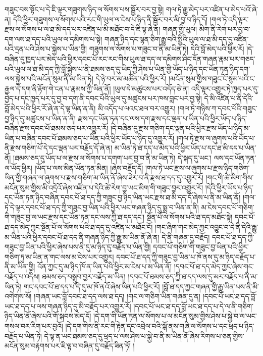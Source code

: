 གཟུང་བས་སྟོང་པ་དེ་ཇི་ལྟར་གཟུགས་ཉིད་ལ་སོགས་པས་སྦྱོར་བར་བྱ་སྟེ། གལ་ཏེ་རྒྱུ་མེད་པར་འཛིན་པ་མེད་པའོ་ཞེ་ན། དེའི་ཕྱིར་གཟུགས་ལ་སོགས་པའི་རང་གི་ཡུལ་ལ་ངེས་པ་ཉིད་ནི་སྦྱོར་བར་མི་བྱ་བ་ཉིད་དོ། །གལ་ཏེ་འདི་ལྟར་རྫས་ལ་སོགས་པ་ལ་ཐ་མི་དད་པར་འཛིན་པ་མི་མཐོང་བ་དེ་ཇི་ལྟ་ཞེ་ན། གཞན་གྱི་ཡུལ། མིག་ནི་རེག་པར་བྱ་བ་དག་ལས་ཐ་དད་པའི་ཡུལ་ལ་དམིགས་པ་སྟེ། གཞན་ཉིད་དང་ལྷན་ཅིག་རྒྱུ་བའི་སྤྱིའི་ཡུལ་ལ་ཐ་མི་དད་དུ་འཛིན་པའི་དྲན་པའི་ཤེས་པ་སྐྱེས་པ་ཡིན་གྱི། གཟུགས་ལ་སོགས་པ་གཟུང་བ་ནི་མ་ཡིན་ཏེ། དེའི་བློ་མེད་པའི་ཕྱིར་རོ། །དེ་བཞིན་དུ་ཁྱད་པར་མེད་པའི་ཕྱིར་དབང་པོ་རང་རང་གིས་ཡུལ་ཐ་དད་ལ་དམིགས་ཤིང་དོན་གཞན་རྣམ་པར་གཅད་པའི་ཡུལ་ལ་ཐ་མི་དད་ཀྱི་བློ་སྐྱེས་པ་ནི་ཐམས་ཅད་དུ་ཡིད་ཀྱི་ཤེས་པ་ཡིན་གྱི་ཡོད་པ་ཉིད་དང་ཡོན་ཏན་ཉིད་དག་ལས་སྐྱེས་པའི་མངོན་སུམ་ནི་མ་ཡིན་ཏེ། དེ་ཉེ་བར་མ་མཚོན་པའི་ཕྱིར་རོ། །མངོན་སུམ་གྱིས་གཟུང་ངོ་སྙམ་པའི་ང་རྒྱལ་དེ་དག་ནི་རྟོག་གེ་ངན་པ་རྣམས་ཀྱི་ཡིན་ནོ། །ཡུལ་དེ་མཚུངས་པར་འདོད་ཅེ་ན། འདི་ལྟར་འགྱུར་ཏེ་ཁྱད་པར་དུ་བྱེད་པ་དང་ཁྱད་པར་དུ་བྱ་བ་དག་ནི་དབང་པོའི་ཡུལ་དུ་མཚུངས་པར་ཁས་བླང་པར་བྱ་སྟེ། དེ་མི་འཛིན་པ་ནི་དེའི་བློ་མེད་པའི་ཕྱིར་རོ་ཞེ་ན་དེ་ལྟ་ཡིན་ན་ནི། མི་འདོད་པ་ལའང་ཐལ་བར་འགྱུར། །གལ་ཏེ་གཉིས་ཀ་དབང་པོའི་གཟུང་བྱ་ཉིད་དུ་མཚུངས་པ་ཡིན་ན་ནི། རྫས་དང་ཡོན་ཏན་དང་ལས་དག་རྫས་དང་ལྡན་པ་ཡིན་པའི་ཕྱིར་ཡོད་པ་ཉིད་བཞིན་རྫས་དབང་པོ་ཐམས་ཅད་པར་འགྱུར་རོ། །དེ་བཞིན་དུ་རྫས་གཅིག་དང་ལྡན་པའི་ཕྱིར་རྫས་ཡོད་པ་ཉིད་མ་ཡིན་པ་བཞིན་དབང་པོ་ཐམས་ཅད་པ་ཡིན་པའི་ཕྱིར་ཡོད་པ་ཉིད་དུ་འགྱུར་རོ། །གལ་ཏེ་རྫས་ལ་ཞུགས་པའི་ཡོད་པ་ནི་རྫས་གཅིག་པོ་དེ་དང་ལྡན་པར་བརྗོད་དོ་ཞེ་ན། མ་ཡིན་ཏེ་ཐ་དད་པ་མེད་པའི་ཕྱིར་ཡོད་པ་དང་ཐ་མི་དད་པ་ཡིན་ནོ། །ཐམས་ཅད་དུ་ཡོད་པ་ལ་རྫས་ལ་སོགས་པ་དགག་པར་བྱ་བ་ནི་མ་ཡིན་ཏེ། དེ་སྐད་དུ་ཡང་། ལས་དང་ཡོན་ཏན་ལ་ཡོད་ཕྱིར། །ཡོད་པ་ལས་མིན་ཡོན་ཏན་མིན། །ཞེས་བརྗོད་དོ། །གལ་ཏེ་ཡང་རྫས་ལ་ཞུགས་པ་རྫས་ཉིད་གཅིག་ཡིན་གྱི་གཞན་ལ་ཞུགས་པ་རྫས་གཅིག་མ་ཡིན་ནོ་ཞེས་ཟེར་བ་ནི་རྫས་ཐ་དད་དུ་འགྱུར་རོ། །གང་གི་ཚེ་མིག་གིས་མངོན་སུམ་གྱིས་མི་འདྲེའོ་ཞེས་འཛིན་པ་དེའི་ཚེ་རེག་བྱ་ཡང་མིག་གི་གཟུང་བྱར་འགྱུར་རོ། །དེའི་ཕྱིར་ཡོད་པ་ཉིད་དང་ཡོན་ཏན་ཉིད་བཞིན་དབང་པོ་ཐ་དད་ཀྱི་གཟུང་བྱ་ཉིད་ཡིན་ཡང་རྫས་ཐ་མི་དད་དོ་ཞེས་པ་ནི་མ་ཡིན་ནོ། །གལ་ཏེ་དེ་ལྟར་དབང་པོ་ཐ་དད་ཀྱི་གཟུང་བྱ་ཡིན་པའི་ཕྱིར་ཡང་གཞན་ཉིད་དུ་སྨྲ་བ་ཡིན་ན་ནི། མ་ངེས་དབང་པོ་གཅིག་གི་གཟུང་བྱ་ལ་ཡང་རྫས་དང་ཡོན་ཏན་དང་ལས་ཀྱི་ཐ་དད་དང་། སྔོན་པོ་ལ་སོགས་པའི་ཐ་དད་མཐོང་སྟེ། དབང་པོ་ཐ་དད་མེད་ཀྱང་སྔོན་པོ་ལ་སོགས་པའི་ཐ་དད་དུ་འཛིན་པ་མཐོང་ངོ། །གང་ཞིག་གང་མེད་ཀྱང་འབྱུང་བ་དེ་ནི་དེའི་རྒྱུ་མ་ཡིན་པའི་ཕྱིར་དབང་པོ་ཐ་དད་ནི་གཞན་ཉིད་ཀྱི་རྒྱུ་མ་ཡིན་ནོ་ཞེ་ན། དེ་ནི་གཞན་དུ་བརྗོད། དབང་པོ་ཐ་དད་ཀྱི་གཟུང་བྱ་ཡིན་པའི་ཕྱིར་ཞེས་པས་ནི་དུ་མ་ཉིད་དུ་བརྗོད་པ་ཡིན་གྱི། དབང་པོ་གཅིག་གི་གཟུང་བྱ་ཡིན་པའི་ཕྱིར་གཅིག་ཏུ་མ་ཡིན་ན་གང་ལས་མ་ངེས་པར་འགྱུར། དབང་པོ་ཐ་དད་ཀྱི་གཟུང་བྱ་ཡིན་པ་ཁོ་ནས་དུ་མ་ཉིད་བརྗོད་པ་ནི་མ་ཡིན་གྱི། འོན་ཀྱང་དུ་མ་ཉིད་ཁོ་ན་ཡིན་པའི་ཕྱིར་མ་ངེས་པ་མ་ཡིན་ནོ། །དབང་པོ་ཐ་དད་མེད་ཀྱང་ཞེས་གང་བརྗོད་པ་འདིས། ཐམས་ཅད་བསྒྲུབ་བྱར་བརྗོད་མ་ཡིན། །དབང་པོ་ཐམས་ཅད་ཀྱི་ཐ་དད་ལས་དུ་མར་བརྗོད་པ་ནི་མ་ཡིན་ཏེ། གང་དབང་པོ་ཐ་དད་པ་དེ་དུ་མ་ཁོ་ནའོ་ཞེས་ཡིན་པའི་ཕྱིར་རོ། །བློ་ཐ་དད་ཀྱང་གཞན་གྱི་རྒྱུ་ཡིན་པས་ནི་མི་འགེགས་སོ། །གཞན་ཡང་བློ་དབང་ཐ་དད་ལས་ཐ་དད། །གང་ལ་གཅིག་ཡིན་གཞན་དུ་ན། །དབང་པོ་ཡང་ཐ་དད་བློ་ཡང་ཐ་དད་པ་ལས་གཞན་ཉིད་དུ་མི་བརྗོད་པར་འགྱུར་རོ། །དབང་པོ་ཡང་ཐ་དད་བློ་ཡང་ཐ་དད་པ་དེ་ལ་ནི་གཅིག་ཉིད་ཡིན་ནོ་ཞེས་པའི་གོ་སྐབས་མེད་དོ། །དེ་དག་གི་ཡོན་ཏན་ལ་སོགས་པ་ལ་མངོན་སུམ་གྱིས་ཤེས་པ་སྐྱེ་བ་ལ་ཡང་གསལ་བར་རིག་པར་བྱའོ། །དེ་དག་གིས་ནི་རང་གི་རྟེན་དང་འབྲེལ་བའི་སྒོ་ནས་གཞི་ལ་སོགས་པ་དང་ཕྲད་པ་ཉིད་བརྗོད་པ་ཡིན་ཏེ། དེ་ལྟ་ན་ཡང་ཐམས་ཅད་དུ་ཕྲད་པ་ལས་ཤེས་པ་སྐྱེ་བ་ནི་མ་ཡིན་ནོ་ཞེས་རིགས་པ་ཅན་གྱིས་མངོན་སུམ་བརྟགས་པར་ཇི་ལྟ་བ་བཞིན་དུ་བརྗོད་ཟིན་ཏོ། །

